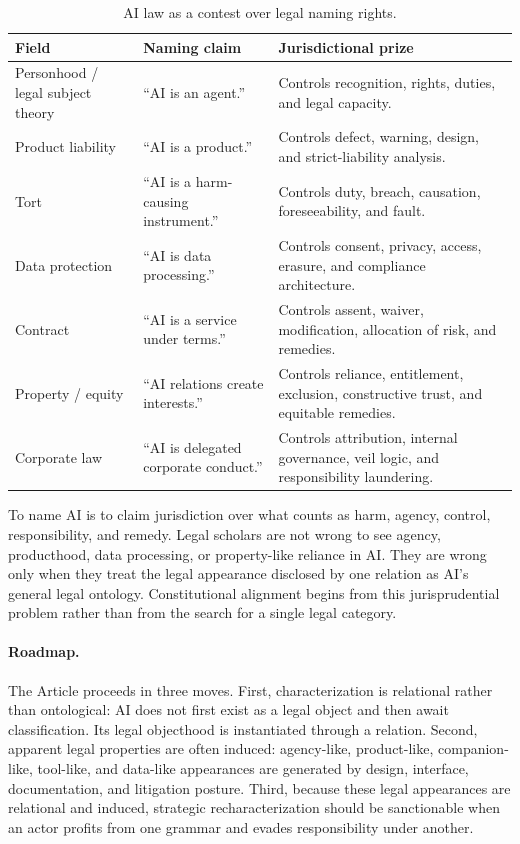 \documentclass{lawreview}
\begin{document}
    \begin{table}[htbp]
        \centering
        \small
        \renewcommand{\arraystretch}{1.18}
        \begin{tabularx}{\textwidth}{@{}>{\raggedright\arraybackslash}p{}>{\raggedright\arraybackslash}p{}Y@{}}
            \toprule
            \textbf{Field} & \textbf{Naming claim} & \textbf{Jurisdictional prize} \\
            \midrule
            Personhood / legal subject theory & ``AI is an agent.'' & Controls recognition, rights, duties, and legal capacity. \\
            Product liability & ``AI is a product.'' & Controls defect, warning, design, and strict-liability analysis. \\
            Tort & ``AI is a harm-causing instrument.'' & Controls duty, breach, causation, foreseeability, and fault. \\
            Data protection & ``AI is data processing.'' & Controls consent, privacy, access, erasure, and compliance architecture. \\
            Contract & ``AI is a service under terms.'' & Controls assent, waiver, modification, allocation of risk, and remedies. \\
            Property / equity & ``AI relations create interests.'' & Controls reliance, entitlement, exclusion, constructive trust, and equitable remedies. \\
            Corporate law & ``AI is delegated corporate conduct.'' & Controls attribution, internal governance, veil logic, and responsibility laundering. \\
            \bottomrule
        \end{tabularx}
        \caption{AI law as a contest over legal naming rights.}
        \label{tab:naming-rights}
    \end{table}

    To name AI is to claim jurisdiction over what counts as harm, agency, control, responsibility, and remedy. Legal scholars are not wrong to see agency, producthood, data processing, or property-like reliance in AI. They are wrong only when they treat the legal appearance disclosed by one relation as AI's general legal ontology. Constitutional alignment begins from this jurisprudential problem rather than from the search for a single legal category.


    \paragraph{Roadmap.}
    The Article proceeds in three moves. First, characterization is relational rather than ontological: AI does not first exist as a legal object and then await classification. Its legal objecthood is instantiated through a relation. Second, apparent legal properties are often induced: agency-like, product-like, companion-like, tool-like, and data-like appearances are generated by design, interface, documentation, and litigation posture. Third, because these legal appearances are relational and induced, strategic recharacterization should be sanctionable when an actor profits from one grammar and evades responsibility under another.
\end{document}
